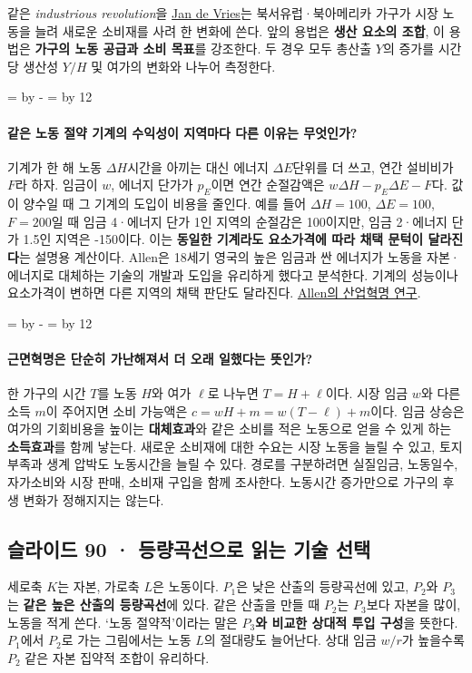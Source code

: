 \documentclass[10pt,a4paper]{article}
\newcommand{\ReserveQuestionSpace}{%
  \par\begingroup
  \dimen0=\pagegoal \advance\dimen0 by -\pagetotal
  \dimen2=\baselineskip \multiply\dimen2 by 12
  \ifdim\dimen0<\dimen2 \newpage\fi
  \endgroup}
\begin{document}
같은 \emph{industrious revolution}을 \href{https://www.cambridge.org/core/books/the-industrious-revolution/E79469E295F0526387FB0AEB235AFC98}{Jan de Vries}는 북서유럽·북아메리카 가구가 시장 노동을 늘려 새로운 소비재를 사려 한 변화에 쓴다. 앞의 용법은 \textbf{생산 요소의 조합}, 이 용법은 \textbf{가구의 노동 공급과 소비 목표}를 강조한다. 두 경우 모두 총산출 $Y$의 증가를 시간당 생산성 $Y/H$ 및 여가의 변화와 나누어 측정한다.\par

\ReserveQuestionSpace
\paragraph{같은 노동 절약 기계의 수익성이 지역마다 다른 이유는 무엇인가?}
기계가 한 해 노동 $\Delta H$시간을 아끼는 대신 에너지 $\Delta E$단위를 더 쓰고, 연간 설비비가 $F$라 하자. 임금이 $w$, 에너지 단가가 $p_E$이면 연간 순절감액은 $w\Delta H-p_E\Delta E-F$다. 값이 양수일 때 그 기계의 도입이 비용을 줄인다. 예를 들어 $\Delta H=100$, $\Delta E=100$, $F=200$일 때 임금 4·에너지 단가 1인 지역의 순절감은 100이지만, 임금 2·에너지 단가 1.5인 지역은 -150이다. 이는 \textbf{동일한 기계라도 요소가격에 따라 채택 문턱이 달라진다}는 설명용 계산이다. Allen은 18세기 영국의 높은 임금과 싼 에너지가 노동을 자본·에너지로 대체하는 기술의 개발과 도입을 유리하게 했다고 분석한다. 기계의 성능이나 요소가격이 변하면 다른 지역의 채택 판단도 달라진다. \href{https://onlinelibrary.wiley.com/doi/10.1111/j.1468-0289.2010.00532.x}{Allen의 산업혁명 연구}.\par

\ReserveQuestionSpace
\paragraph{근면혁명은 단순히 가난해져서 더 오래 일했다는 뜻인가?}
한 가구의 시간 $T$를 노동 $H$와 여가 $\ell$로 나누면 $T=H+\ell$이다. 시장 임금 $w$와 다른 소득 $m$이 주어지면 소비 가능액은 $c=wH+m=w(T-\ell)+m$이다. 임금 상승은 여가의 기회비용을 높이는 \textbf{대체효과}와 같은 소비를 적은 노동으로 얻을 수 있게 하는 \textbf{소득효과}를 함께 낳는다. 새로운 소비재에 대한 수요는 시장 노동을 늘릴 수 있고, 토지 부족과 생계 압박도 노동시간을 늘릴 수 있다. 경로를 구분하려면 실질임금, 노동일수, 자가소비와 시장 판매, 소비재 구입을 함께 조사한다. 노동시간 증가만으로 가구의 후생 변화가 정해지지는 않는다.\par

\subsection{슬라이드 90 · 등량곡선으로 읽는 기술 선택}
세로축 $K$는 자본, 가로축 $L$은 노동이다. $P_1$은 낮은 산출의 등량곡선에 있고, $P_2$와 $P_3$는 \textbf{같은 높은 산출의 등량곡선}에 있다. 같은 산출을 만들 때 $P_2$는 $P_3$보다 자본을 많이, 노동을 적게 쓴다. ‘노동 절약적’이라는 말은 \textbf{$P_3$와 비교한 상대적 투입 구성}을 뜻한다. $P_1$에서 $P_2$로 가는 그림에서는 노동 $L$의 절대량도 늘어난다. 상대 임금 $w/r$가 높을수록 $P_2$ 같은 자본 집약적 조합이 유리하다.\par
\end{document}
